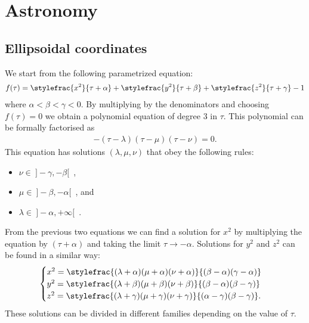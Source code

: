 \chapter{Astronomy}

\section{Ellipsoidal coordinates}

    We start from the following parametrized equation:
    \begin{gather}\index{coordinate!ellipsoidal}
        \label{astronomy:ellipsoidal_defining_function}
        f(\tau) = \stylefrac{x^2}{\tau + \alpha} + \stylefrac{y^2}{\tau + \beta} + \stylefrac{z^2}{\tau + \gamma} - 1
    \end{gather}
    where $\alpha<\beta<\gamma<0$. By multiplying by the denominators and choosing $f(\tau) = 0$ we obtain a polynomial equation of degree 3 in $\tau$. This polynomial can be formally factorised as
    \begin{gather}
        -(\tau-\lambda)(\tau-\mu)(\tau-\nu) = 0.
    \end{gather}
    This equation has solutions $(\lambda, \mu, \nu)$ that obey the following rules:
    \begin{itemize}
        \item $\nu\in\ ]-\gamma,-\beta[$\ ,
        \item $\mu\in\ ]-\beta,-\alpha[$\ , and
        \item $\lambda\in\ ]-\alpha,+\infty[$\ .
    \end{itemize}
    From the previous two equations we can find a solution for $x^2$ by multiplying the equation by $(\tau+\alpha)$ and taking the limit $\tau\rightarrow-\alpha$. Solutions for $y^2$ and $z^2$ can be found in a similar way:
    \begin{gather}
        \label{astronomy:ellipsoidal_coordinates}
        \begin{cases}
            x^2 = \stylefrac{(\lambda + \alpha)(\mu + \alpha)(\nu + \alpha)}{(\beta - \alpha)(\gamma - \alpha)}&\\
            y^2 = \stylefrac{(\lambda + \beta)(\mu + \beta)(\nu + \beta)}{(\beta - \alpha)(\beta - \gamma)}&\\
            z^2 = \stylefrac{(\lambda + \gamma)(\mu + \gamma)(\nu + \gamma)}{(\alpha - \gamma)(\beta - \gamma)}.&
        \end{cases}
    \end{gather}
    These solutions can be divided in different families depending on the value of $\tau$.


